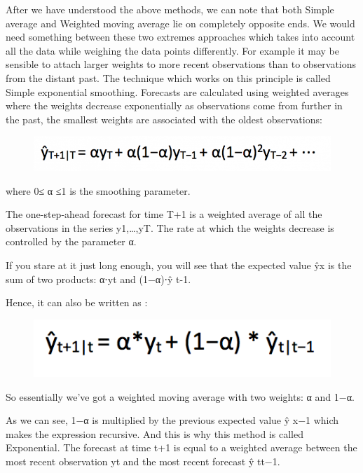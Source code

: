 \documentclass[11pt]{article}
\makeatletter
\def\maxwidth{\ifdim\Gin@nat@width>\linewidth\linewidth
    \else\Gin@nat@width\fi}
\let\Oldincludegraphics\includegraphics
\renewcommand{\includegraphics}[1]{\Oldincludegraphics[width=.8\maxwidth]{#1}}
\makeatother
\begin{document}
After we have understood the above methods, we can note that both Simple
average and Weighted moving average lie on completely opposite ends. We
would need something between these two extremes approaches which takes
into account all the data while weighing the data points differently.
For example it may be sensible to attach larger weights to more recent
observations than to observations from the distant past. The technique
which works on this principle is called Simple exponential smoothing.
Forecasts are calculated using weighted averages where the weights
decrease exponentially as observations come from further in the past,
the smallest weights are associated with the oldest observations:

\begin{figure}
\centering
\includegraphics{image8.png}
\caption{}
\end{figure}

where 0≤ α ≤1 is the smoothing parameter.

The one-step-ahead forecast for time T+1 is a weighted average of all
the observations in the series y1,\ldots{},yT. The rate at which the
weights decrease is controlled by the parameter α.

If you stare at it just long enough, you will see that the expected
value ŷx is the sum of two products: α⋅yt and (1−α)⋅ŷ t-1.

Hence, it can also be written as :

\begin{figure}
\centering
\includegraphics{image9.png}
\caption{}
\end{figure}

So essentially we've got a weighted moving average with two weights: α
and 1−α.

As we can see, 1−α is multiplied by the previous expected value ŷ x−1
which makes the expression recursive. And this is why this method is
called Exponential. The forecast at time t+1 is equal to a weighted
average between the most recent observation yt and the most recent
forecast ŷ t\textbar{}t−1.
\end{document}

